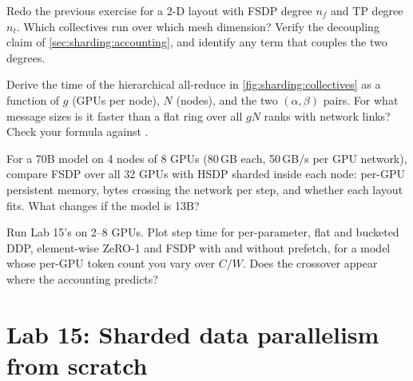 \begin{exercise}[Accounting: 2-D]
Redo the previous exercise for a 2-D layout with FSDP degree $n_f$ and TP degree $n_t$. Which
collectives run over which mesh dimension? Verify the decoupling claim of
\cref{sec:sharding:accounting}, and identify any term that couples the two degrees.
\end{exercise}

\begin{exercise}
Derive the time of the hierarchical all-reduce in \cref{fig:sharding:collectives} as a function of
$g$ (GPUs per node), $N$ (nodes), and the two $(\alpha,\beta)$ pairs. For what message sizes is
it faster than a flat ring over all $gN$ ranks with network links? Check your formula against
.
\end{exercise}

\begin{exercise}
For a 70B model on 4 nodes of 8 GPUs (80\,GB each, 50\,GB/s per GPU network), compare FSDP over
all 32 GPUs with HSDP sharded inside each node: per-GPU persistent memory, bytes crossing the network
per step, and whether each layout fits. What changes if the model is 13B?
\end{exercise}

\begin{exercise}[Measurement]
Run Lab 15's  on 2--8 GPUs. Plot step time for per-parameter, flat and bucketed DDP,
element-wise ZeRO-1 and FSDP with and without prefetch, for a model whose per-GPU token count you
vary over $C/W$. Does the crossover appear where the accounting predicts?
\end{exercise}

\section{Lab 15: Sharded data parallelism from scratch}\label{sec:sharding:lab}

